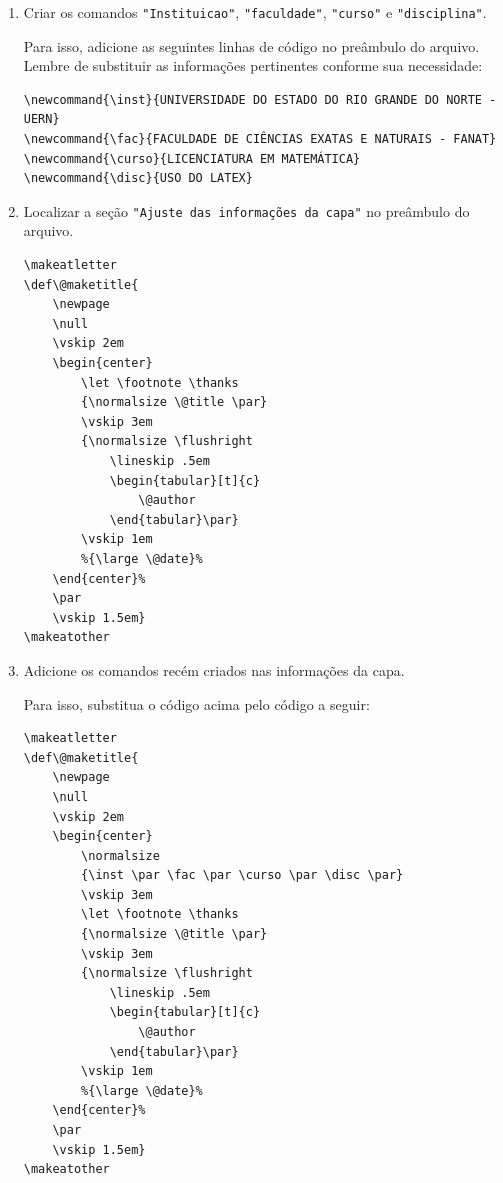 \documentclass[
article,			%
12pt,				%
oneside,			%
a4paper,			%
english,			%
brazil,				%
sumario=tradicional
]{abntex2}
\makeatletter
\def\@maketitle{
	\newpage
	\null
	\vskip 2em
	\begin{center}
		\let \footnote \thanks
		{\normalsize \@title \par}
		\vskip 3em
		{\normalsize \flushright
			\lineskip .5em
			\begin{tabular}[t]{c}
				\@author
			\end{tabular}\par}
		\vskip 1em
	\end{center}%
	\par
	\vskip 1.5em}
\makeatother
\begin{document}
    \begin{enumerate}
       \item Criar os comandos \texttt{"Instituicao"}, \texttt{"faculdade"}, \texttt{"curso"} e \texttt{"disciplina"}. 
       
       Para isso, adicione as seguintes linhas de código no preâmbulo do arquivo. Lembre de substituir as informações pertinentes conforme sua necessidade:

    \begin{verbatim}
\newcommand{\inst}{UNIVERSIDADE DO ESTADO DO RIO GRANDE DO NORTE - UERN}
\newcommand{\fac}{FACULDADE DE CIÊNCIAS EXATAS E NATURAIS - FANAT}
\newcommand{\curso}{LICENCIATURA EM MATEMÁTICA}
\newcommand{\disc}{USO DO LATEX}
\end{verbatim}

       
        \item Localizar a seção \texttt{"Ajuste das informações da capa"} no preâmbulo do arquivo.

        \begin{verbatim}
\makeatletter
\def\@maketitle{
	\newpage
	\null
	\vskip 2em
	\begin{center}
		\let \footnote \thanks
		{\normalsize \@title \par}
		\vskip 3em
		{\normalsize \flushright
			\lineskip .5em
			\begin{tabular}[t]{c}
				\@author
			\end{tabular}\par}
		\vskip 1em
		%{\large \@date}%
	\end{center}%
	\par
	\vskip 1.5em}
\makeatother
    \end{verbatim}

    \item Adicione os comandos recém criados nas informações da capa.

    Para isso, substitua o código acima pelo código a seguir:

\begin{verbatim}
\makeatletter
\def\@maketitle{
	\newpage
	\null
	\vskip 2em
	\begin{center}
        \normalsize
        {\inst \par \fac \par \curso \par \disc \par}
        \vskip 3em
		\let \footnote \thanks
		{\normalsize \@title \par}
		\vskip 3em
		{\normalsize \flushright
			\lineskip .5em
			\begin{tabular}[t]{c}
				\@author
			\end{tabular}\par}
		\vskip 1em
		%{\large \@date}%
	\end{center}%
	\par
	\vskip 1.5em}
\makeatother
    \end{verbatim} 
    \end{enumerate}
\end{document}
